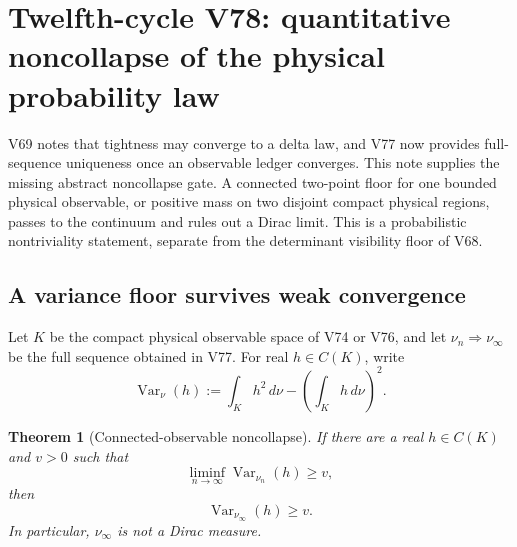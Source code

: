\documentclass[11pt]{article}
\newtheorem{theorem}{Theorem}[section]
\theoremstyle{remark}
\begin{document}


\section{Twelfth-cycle V78: quantitative noncollapse of the physical
probability law}
\label{sec:v12v78}

V69 notes that tightness may converge to a delta law, and V77 now
provides full-sequence uniqueness once an observable ledger
converges.  This note supplies the missing abstract noncollapse gate.
A connected two-point floor for one bounded physical observable, or
positive mass on two disjoint compact physical regions, passes to
the continuum and rules out a Dirac limit.  This is a probabilistic
nontriviality statement, separate from the determinant visibility
floor of V68.

\subsection{A variance floor survives weak convergence}

Let \(K\) be the compact physical observable space of V74 or V76,
and let \(\nu_n\Rightarrow\nu_\infty\) be the full sequence obtained
in V77.  For real \(h\in C(K)\), write
\[
 \operatorname{Var}_\nu(h)
 :=
 \int_Kh^2\,d\nu-\left(\int_Kh\,d\nu\right)^2.               \tag{78.1}
\]

\begin{theorem}[Connected-observable noncollapse]
\label{thm:v12v78-variance}
If there are a real \(h\in C(K)\) and \(v>0\) such that
\begin{equation}
                 \liminf_{n\to\infty}
                 \operatorname{Var}_{\nu_n}(h)\geq v,        \tag{78.2}
\end{equation}
then
\begin{equation}
                 \operatorname{Var}_{\nu_\infty}(h)\geq v.  \tag{78.3}
\end{equation}
In particular, \(\nu_\infty\) is not a Dirac measure.
\end{theorem}
\end{document}

